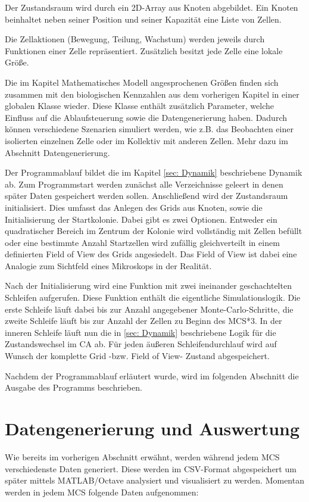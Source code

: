 \documentclass[11pt,a4paper,pointlessnumbers]{scrreprt}  %
\begin{document}
Der Zustandsraum wird durch ein 2D-Array aus Knoten abgebildet. Ein Knoten beinhaltet neben seiner Position und seiner Kapazität eine Liste von Zellen. \par 

Die Zellaktionen (Bewegung, Teilung, Wachstum) werden jeweils durch Funktionen einer Zelle repräsentiert. Zusätzlich besitzt jede Zelle eine lokale Größe.

Die im Kapitel Mathematisches Modell angesprochenen Größen finden sich zusammen mit den biologischen Kennzahlen aus dem vorherigen Kapitel in einer globalen Klasse wieder. Diese Klasse enthält zusätzlich Parameter, welche Einfluss auf die Ablaufsteuerung sowie die Datengenerierung haben. Dadurch können verschiedene Szenarien simuliert werden, wie z.B. das Beobachten einer isolierten einzelnen Zelle oder im Kollektiv mit anderen Zellen. Mehr dazu im Abschnitt Datengenerierung.

Der Programmablauf bildet die im Kapitel \ref{sec: Dynamik} beschriebene Dynamik ab. Zum Programmstart werden zunächst alle Verzeichnisse geleert in denen später Daten gespeichert werden sollen. Anschließend wird der Zustandsraum initialisiert. Dies umfasst das Anlegen des Grids aus Knoten, sowie die Initialisierung der Startkolonie. Dabei gibt es zwei Optionen. Entweder ein quadratischer Bereich im Zentrum der Kolonie wird vollständig mit Zellen befüllt oder eine bestimmte Anzahl Startzellen wird zufällig gleichverteilt in einem definierten Field of View des Grids angesiedelt. Das Field of View ist dabei eine Analogie zum Sichtfeld eines Mikroskops in der Realität.\par Nach der Initialisierung wird eine Funktion mit zwei ineinander geschachtelten Schleifen aufgerufen. Diese Funktion enthält die eigentliche Simulationslogik. Die erste Schleife läuft dabei bis zur Anzahl angegebener Monte-Carlo-Schritte, die zweite Schleife läuft bis zur Anzahl der Zellen zu Beginn des MCS*3. In der inneren Schleife läuft nun die in \ref{sec: Dynamik} beschriebene Logik für die Zustandswechsel im CA ab. Für jeden äußeren Schleifendurchlauf wird auf Wunsch der komplette Grid -bzw. Field of View- Zustand abgespeichert. 

Nachdem der Programmablauf erläutert wurde, wird im folgenden Abschnitt die Ausgabe des Programms beschrieben.


\section{Datengenerierung und Auswertung}
Wie bereits im vorherigen Abschnitt erwähnt, werden während jedem MCS verschiedenste Daten generiert. Diese werden im CSV-Format abgespeichert um später mittels MATLAB/Octave analysiert und visualisiert zu werden. Momentan werden in jedem MCS folgende Daten aufgenommen:
\end{document}
